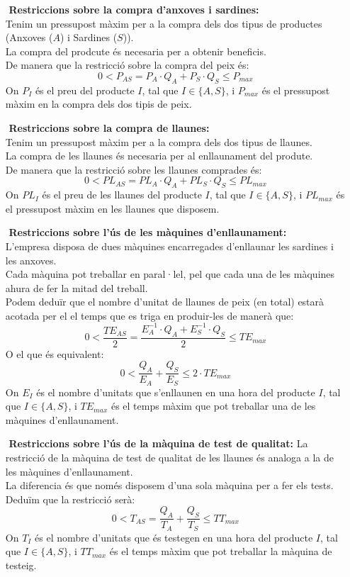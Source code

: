 \documentclass[a4paper, 11pt]{article}
\begin{document}
\begin{itemize}
    \item [$ $] \textbf{Restriccions sobre la compra d'anxoves i sardines:}\\
    Tenim un pressupost màxim per a la compra dels dos tipus de productes (Anxoves ($A$) i Sardines ($S$)).\\
    La compra del prodcute és necesaria per a obtenir beneficis.\\
    De manera que la restricció sobre la compra del peix és:
    $$ 0 < P_{AS} = P_A \cdot Q_A + P_S \cdot Q_S \leq P_{max} $$
    On $P_I$ és el preu del producte $I$, tal que $I\in\{A,S\}$, i $P_{max}$ és el pressupost màxim en la compra dels dos tipis de peix.    
    \item [$ $] \textbf{Restriccions sobre la compra de llaunes:}\\
    Tenim un pressupost màxim per a la compra dels dos tipus de llaunes.\\
    La compra de les llaunes és necesaria per al enllaunament del produte.\\
    De manera que la restricció sobre les llaunes comprades és:
    $$ 0 < PL_{AS} = PL_A \cdot Q_A + PL_S \cdot Q_S \leq PL_{max} $$
    On $PL_I$ és el preu de les llaunes del producte $I$, tal que $I\in\{A,S\}$, i $PL_{max}$ és el pressupost màxim en les llaunes que disposem.    
    \item [$ $] \textbf{Restriccions sobre l'ús de les màquines d'enllaunament:}\\
    L'empresa disposa de dues màquines encarregades d'enllaunar les sardines i les anxoves.\\
    Cada màquina pot treballar en paral·lel, pel que cada una de les màquines ahura de fer la mitad del treball.\\
    Podem deduïr que el nombre d'unitat de llaunes de peix (en total) estarà acotada per el el temps que es triga en produir-les de manerà que:
    $$0 < \frac{TE_{AS}}{2} = \frac{E_A^{-1}\cdot Q_A + E_S^{-1}\cdot Q_S}{2} \leq TE_{max}$$
    O el que és equivalent:
    $$0 < \frac{Q_A}{E_A}  + \frac{Q_S}{E_S} \leq 2\cdot TE_{max}$$
    On $E_I$ és el nombre d'unitats que s'enllaunen en una hora del producte $I$, tal que $I\in\{A,S\}$, i $TE_{max}$ és el temps màxim que pot treballar una  de les màquines d'enllaunament.
    \item [$ $] \textbf{Restriccions sobre l'ús de la màquina de test de qualitat:}
    La restricció de la màquina de test de qualitat de les llaunes és analoga a la de les màquines d'enllaunament.\\
    La diferencia és que només disposem d'una sola màquina per a fer els tests.\\
    Deduïm que la restricció serà:
    $$0 < T_{AS} = \frac{Q_A}{T_A} + \frac{Q_S}{T_S} \leq TT_{max}$$
    On $T_I$ és el nombre d'unitats que és testegen en una hora del producte $I$, tal que $I\in\{A,S\}$, i $TT_{max}$ és el temps màxim que pot treballar la màquina de testeig.
\end{itemize}
\end{document}
